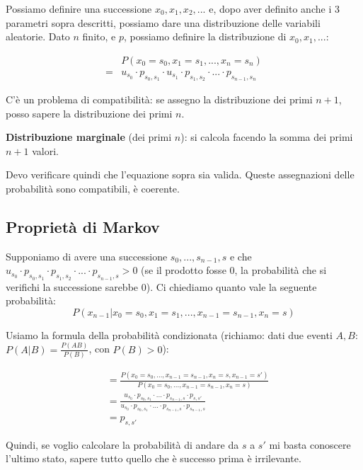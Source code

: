 \documentclass[a4paper,12pt]{book}
\begin{document}
Possiamo definire una successione $ x_0, x_1, x_2, ... $ e, dopo aver definito anche i 3 parametri sopra descritti, possiamo dare una distribuzione delle variabili aleatorie. Dato $ n $ finito, e $ p $, possiamo definire la distribuzione di $ x_0, x_1, ... $:

\begin{align*}
	& P(x_0 = s_0, x_1 = s_1, ..., x_n = s_n) \\
	= & u_{s_0} \cdot p_{s_0, s_1} \cdot u_{s_1} \cdot p_{s_1, s_2} \cdot ... \cdot p_{s_{n-1}, s_n}
\end{align*}

C'è un problema di compatibilità: se assegno la distribuzione dei primi $ n+1 $, posso sapere la distribuzione dei primi $ n $. %

\textbf{Distribuzione marginale} (dei primi $ n $): si calcola facendo la somma dei primi $ n+1 $ valori. 

Devo verificare quindi che l'equazione sopra sia valida. %
Queste assegnazioni delle probabilità sono compatibili, è coerente. 

\subsection{Proprietà di Markov}
Supponiamo di avere una successione $ s_0, ..., s_{n-1}, s $
e che $ u_{s_0} \cdot p_{s_0, s_1} \cdot p_{s_1, s_2} \cdot ... \cdot p_{s_{n-1}, s}  > 0 $ (se il prodotto fosse 0, la probabilità che si verifichi la successione sarebbe 0). 
Ci chiediamo quanto vale la seguente probabilità:
$$ P(x_{n-1} | x_0 = s_0, x_1 = s_1, ..., x_{n-1} = s_{n-1}, x_n = s) $$

Usiamo la formula della probabilità condizionata (richiamo: dati due eventi $ A, B $: $ P(A|B) = \frac{P(AB)}{P(B)} $, con $ P(B) > 0 $):

\begin{align*}
	& = \frac{P(x_0 = s_0, ..., x_{n-1} = s_{n-1}, x_n = s, x_{n-1} = s')}{P(x_0 = s_0, ..., x_{n-1} = s_{n-1}, x_n = s)} \\
	& = \frac{u_{s_0}\cdot p_{s_0, s_1} \cdot ... \cdot p_{s_{n-1}, s} \cdot p_{s,s'}}{u_{s_0}\cdot p_{s_0, s_1} \cdot ... \cdot p_{s_{n-1}, s} \cdot p_{s_{n-1},s}}\\
	& = p_{s,s'}
\end{align*}

Quindi, se voglio calcolare la probabilità di andare da $ s $ a $ s' $ mi basta conoscere l'ultimo stato, sapere tutto quello che è successo prima è irrilevante. 
\end{document}
